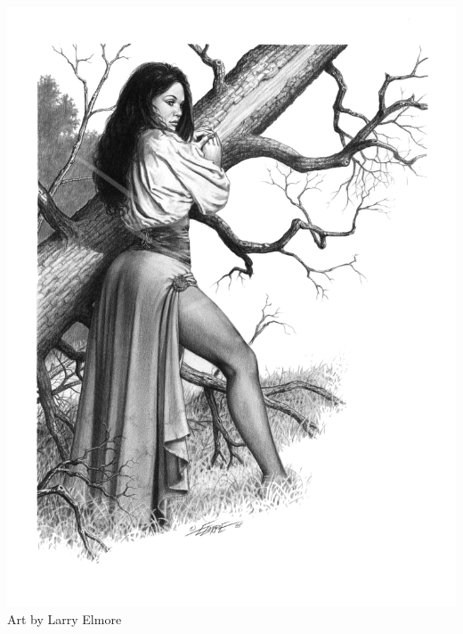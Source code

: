 \begin{multicols*}{2}
\begin{Figure}
\centering
\includegraphics[width=\textwidth]{img/bard.png}
{\scriptsize Art by Larry Elmore}
\end{Figure}
    
\end{multicols*}

        